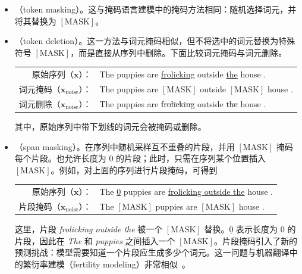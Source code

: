 \begin{itemize}
\item \vspace{0.5em} （token masking）。这与掩码语言建模中的掩码方法相同：随机选择词元，并将其替换为 $\mathrm{[MASK]}$。
\item \vspace{0.3em} （token deletion）。这一方法与词元掩码相似，但不将选中的词元替换为特殊符号 $\mathrm{[MASK]}$，而是直接从序列中删除。下面比较词元掩码与词元删除。

    \begin{center}
    \begingroup
    \renewcommand{\arraystretch}{1.2}
    \begin{tabular}{r l}
    原始序列（$\mathbf{x}$）：& The puppies are \underline{frolicking} outside \underline{the} house . \\
    词元掩码（$\mathbf{x}_{\mathrm{noise}}$）：& The puppies are $\mathrm{[MASK]}$ outside $\mathrm{[MASK]}$ house . \\
    词元删除（$\mathbf{x}_{\mathrm{noise}}$）：& The puppies are {\color{gray} \sout{frolicking}} outside {\color{gray} \sout{the}} house .
    \end{tabular}
    \endgroup
    \end{center}

    \noindent 其中，原始序列中带下划线的词元会被掩码或删除。

\item \vspace{0.3em} （span masking）。在序列中随机采样互不重叠的片段，并用 $\mathrm{[MASK]}$ 掩码每个片段。也允许长度为 0 的片段；此时，只需在序列某个位置插入 $\mathrm{[MASK]}$。例如，对上面的序列进行片段掩码，可得到

    \begin{center}
    \begingroup
    \renewcommand{\arraystretch}{1.2}
    \begin{tabular}{r l}
    原始序列（$\mathbf{x}$）：& The \underline{0} puppies are \underline{frolicking outside the} house . \\
    片段掩码（$\mathbf{x}_{\mathrm{noise}}$）：& The $\mathrm{[MASK]}$ puppies are $\mathrm{[MASK]}$ house .
    \end{tabular}
    \endgroup
    \end{center}

    \noindent 这里，片段 \textit{frolicking outside the} 被一个 $\mathrm{[MASK]}$ 替换。$\underline{0}$ 表示长度为 0 的片段，因此在 \textit{The} 和 \textit{puppies} 之间插入一个 $\mathrm{[MASK]}$。片段掩码引入了新的预测挑战：模型需要知道一个片段应生成多少个词元。这一问题与机器翻译中的繁衍率建模（fertility modeling）非常相似~\cite{brown-etal:1993mathematics}。
\end{itemize}
\vspace{0.5em}

